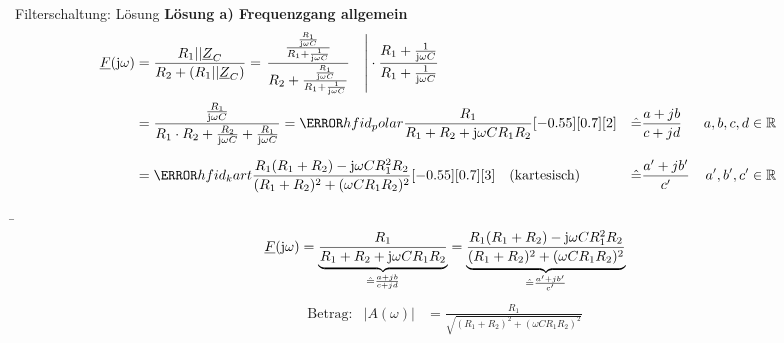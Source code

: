 %
%
\begin{frame}[allowframebreaks]%
\begin{bsp}{Filterschaltung: Lösung}{}%
\textbf{Lösung a) Frequenzgang allgemein}
    \begin{align*}
        \underline{F}(\mathrm{j}\omega) &= \frac{R_1 || \underline{Z}_C}{R_2 + ( R_1 || \underline{Z}_C)} 
        = \left.\frac{\frac{\frac{R_1}{\mathrm{j}\omega C}}{R_1 + \frac{1}{\mathrm{j}\omega C}}}{
            R_2 + \frac{\frac{R_1}{\mathrm{j}\omega C}}{R_1 + \frac{1}{\mathrm{j}\omega C}}}\quad \right| 
            \cdot \frac{R_1 + \frac{1}{\mathrm{j}\omega C}}{R_1 + \frac{1}{\mathrm{j}\omega C}}
        \\[+2pt]
        &= \frac{\frac{R_1}{\mathrm{j}\omega C}}{R_1\cdot R_2 + \frac{R_2}{\mathrm{j}\omega C}+\frac{R_1}{\mathrm{j}\omega C}}
	    = \highlight{hfid_polar}{\frac{R_1}{R_1+R_2+\mathrm{j}\omega CR_1R_2}}[\hfofflowerb][\hfoffupperb][2]
            &&\hat{=}{} \frac{a+jb}{c+jd} 
            & a,b,c,d &\in \mathbb{R}
        \\[+6pt]
        &= \highlight{hfid_kart}{\frac{R_1(R_1+R_2)-\mathrm{j}\omega CR_1^2R_2}{(R_1+R_2)^2+(\omega CR_1R_2)^2}}[\hfofflowerb][\hfoffupperb][3]
        \quad\text{(kartesisch)}
            &&\hat{=}{} \frac{a'+jb'}{c'}
            & a',b',c' &\in \mathbb{R}
    \end{align*}\vspace{-15pt}%
\b{\framebreak}%
\b{%
\begin{equation*}
    \underline{F}(\mathrm{j}\omega) 
    = 
    \underbrace{
        \frac{R_1}{R_1+R_2+\mathrm{j}\omega CR_1R_2}
    }_{\mathrel{
        \hat{=}{} \frac{a+jb}{c+jd}
    }}%
    = 
    \underbrace{%
        \frac{R_1(R_1+R_2)-\mathrm{j}\omega CR_1^2R_2}{(R_1+R_2)^2+(\omega CR_1R_2)^2}
    }_{\mathrel{
        \hat{=}{} \frac{a'+jb'}{c'}
    }}%
\end{equation*}%
}%
    \begin{align*}
        &\text{Betrag:}&
            |A(\omega)| &= \frac{R_1}{\sqrt{(R_1+R_2)^2+(\omega CR_1R_2)^2}}&

\end{align*}
\end{bsp}
\end{frame}
